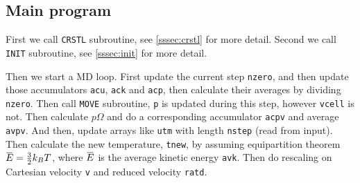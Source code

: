 
\subsection{Main program}

First we call \texttt{CRSTL} subroutine, see \ref{sssec:crstl} for more detail.
Second we call \texttt{INIT} subroutine, see \ref{sssec:init} for more detail.



Then we start a MD loop.
First update the current step \texttt{nzero}, and then update those
accumulators \texttt{acu}, \texttt{ack} and \texttt{acp}, then calculate
their averages by dividing \texttt{nzero}. Then call \texttt{MOVE} subroutine,
\texttt{p} is updated during this step, however \texttt{vcell} is not.
Then calculate $p \Omega$ and do a corresponding accumulator \texttt{acpv} and
average \texttt{avpv}. And then, update arrays like \texttt{utm} with length
\texttt{nstep} (read from input).
Then calculate the new temperature, \texttt{tnew}, by assuming equipartition
theorem $\mean{E} = \frac{ 3 }{ 2 } k_B T$, where $\mean{E}$ is
the average kinetic energy \texttt{avk}.
Then do rescaling on Cartesian velocity \texttt{v} and reduced velocity
\texttt{ratd}.

